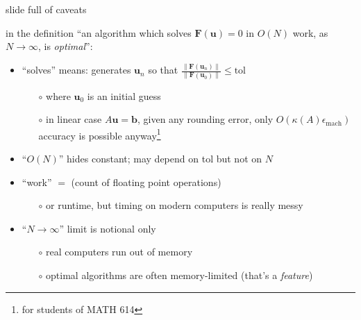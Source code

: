 \documentclass[hide notes,intlimits,usenames,dvipsnames]{beamer}
\newcommand{\bb}{\mathbf{b}}
\newcommand{\bu}{\mathbf{u}}
\newcommand{\eps}{\epsilon}
\begin{document}
\begin{frame}{slide full of caveats}

in the definition ``an algorithm which solves $\mathbf{F}(\mathbf{u}) = 0$ in $O(N)$ work, as $N\to\infty$, is \emph{optimal}'':
\begin{itemize}
\item  ``solves'' means: generates $\mathbf{u}_n$ so that $\frac{\|\mathbf{F}(\mathbf{u}_n)\|}{\|\mathbf{F}(\mathbf{u}_0)\|} \le \text{tol}$
	\begin{itemize}
	\item[$\circ$] where $\mathbf{u}_0$ is an initial guess
	\item[$\circ$] in linear case $A\bu=\bb$, given any rounding error, only $O(\kappa(A)\eps_{\text{mach}})$ accuracy is possible anyway\footnote{for students of MATH 614}
	\end{itemize}
\item ``$O(N)$'' hides constant; may depend on tol but not on $N$
\item ``work'' $=$ (count of floating point operations)
	\begin{itemize}
	\item[$\circ$] or runtime, but timing on modern computers is really messy
	\end{itemize}
\item ``$N\to\infty$'' limit is notional only
	\begin{itemize}
	\item[$\circ$] real computers run out of memory

	\smallskip
	\item[$\circ$] \alert{optimal algorithms are often memory-limited} \scriptsize \hfill (that's a \emph{feature})
	\end{itemize}
\end{itemize}
\end{frame}
\end{document}
